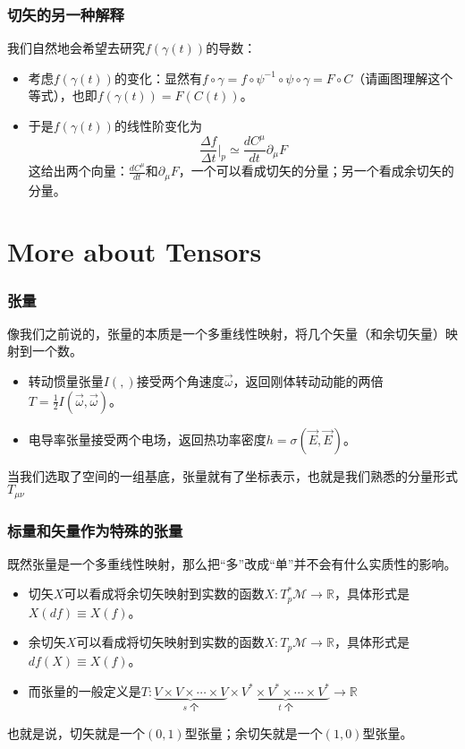 \documentclass[CJK]{beamer}
\newcommand{\reals}{\mathbb{R}}
\newcommand{\mani}{\mathcal{M}}
\begin{document}
\begin{frame}
\frametitle{\bch 切矢的另一种解释 \ech}
\bch
我们自然地会希望去研究$f(\gamma(t))$的导数：
\begin{itemize}
\item 考虑$f(\gamma(t))$的变化：显然有$f\circ \gamma = f \circ \psi^{-1} \circ \psi \circ \gamma = F\circ C$（请画图理解这个等式），也即$f(\gamma(t)) = F(C(t))$。
\item 于是$f(\gamma(t))$的线性阶变化为
$$
\frac{\Delta f}{\Delta t} \big|_p \simeq\frac{dC^\mu }{dt} \partial_\mu F 
$$
这给出两个向量：$\frac{dC^\mu }{dt}$和$\partial_\mu F$，一个可以看成切矢的分量；另一个看成余切矢的分量。
\end{itemize}
\ech
\end{frame}

\section{More about Tensors}
\begin{frame}
\frametitle{\bch 张量 \ech}
\bch
像我们之前说的，张量的本质是一个多重线性映射，将几个矢量（和余切矢量）映射到一个数。
\begin{itemize}
\item 转动惯量张量$I(,)$接受两个角速度$\vec \omega$，返回刚体转动动能的两倍$T = \frac{1}{2} I (\vec \omega,\vec \omega)$。
\item 电导率张量接受两个电场，返回热功率密度$h = \sigma(\vec E,\vec E)$。
\end{itemize}
当我们选取了空间的一组基底，张量就有了坐标表示，也就是我们熟悉的分量形式$T_{\mu \nu}$
\ech
\end{frame}

\begin{frame}
\frametitle{\bch 标量和矢量作为特殊的张量 \ech}
\bch
既然张量是一个多重线性映射，那么把“多”改成“单”并不会有什么实质性的影响。
\begin{itemize}
\item 切矢$X$可以看成将余切矢映射到实数的函数$X:T_p^*\mani \to \reals$，具体形式是$X(df) \equiv X(f)$。
\item 余切矢$X$可以看成将切矢映射到实数的函数$X:T_p\mani \to \reals$，具体形式是$df(X) \equiv X(f)$。
\item 而张量的一般定义是$T:\underbrace{V\times V\times \cdots \times V}_{s\text{ 个}} \times  \underbrace{V^* \times V^* \times \cdots \times V^*}_{t\text{ 个}} \to \reals$
\end{itemize}
也就是说，切矢就是一个$(0,1)$型张量；余切矢就是一个$(1,0)$型张量。
\ech
\end{frame}
\end{document}
